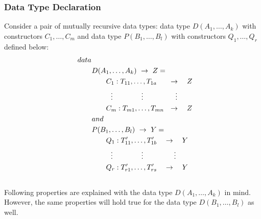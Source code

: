 \documentclass[11pt]{article}
\begin{document}
\subsubsection {Data Type Declaration}\label{sTypeInfer:dataDef}
Consider a pair of mutually recursive data types: data type $D(A_1,\ldots,A_k)$ with constructors $C_1,\ldots,C_m$ and data type $P(B_1,\ldots,B_l)$ with constructors $Q_1,\ldots,Q_r$  defined below: 
\begin{align*} 
&data~ \\
&\qquad  D(A_1,\ldots,A_k)  ~\to~ Z = \\
 &\qquad \qquad C_1 : T_{11},\ldots, T_{1a} ~~~~~\to ~~~ Z \\
 &\qquad \qquad~~ \vdots \hskip 4em \vdots \hskip 4.5em \vdots \\ 
 &\qquad \qquad C_m : T_{m1},\ldots, T_{mn} ~~\to ~~~ Z \\
 &\qquad and \\
&\qquad  P(B_1,\ldots,B_l)  ~\to~ Y = \\
 &\qquad \qquad Q_1 : T_{11}^\prime,\ldots, T_{1b}^\prime ~~~\to ~~~ Y \\
 &\qquad \qquad~~ \vdots \hskip 4em \vdots \hskip 4.3em \vdots \\ 
 &\qquad \qquad Q_r : T_{r1}^\prime,\ldots, T_{rs}^\prime ~~~\to ~~~ Y \\~~\\
\end{align*}
Following properties are explained with the data type $D(A_1,\ldots,A_k)$ in mind. However, the same properties will hold true for the data type $D(B_1,\ldots,B_l)$ as well.
\end{document}
